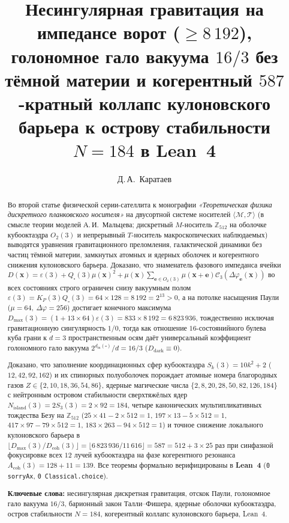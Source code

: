 \documentclass[11pt,a4paper]{article}
\title{\textbf{Несингулярная гравитация на импедансе ворот ($\ge 8\,192$), голономное гало вакуума $16/3$ без тёмной материи и когерентный $587$-кратный коллапс кулоновского барьера к острову стабильности $N = 184$ в Lean~4}}
\author{Д.\,А.~Каратаев}
\date{}
\theoremstyle{plain}
\theoremstyle{definition}
\begin{document}
\maketitle

\begin{abstract}
Во второй статье физической серии-сателлита к монографии \emph{«Теоретическая физика дискретного планковского носителя»} на двусортной системе носителей $\langle\mathcal{M},\mathcal{T}\rangle$ (в смысле теории моделей А.\,И.~Мальцева; дискретный $M$-носитель $\mathbb{Z}_{512}$ на оболочке кубооктаэдра $O_2(3)$ и непрерывный $T$-носитель макроскопических наблюдаемых) выводятся уравнения гравитационного преломления, галактической динамики без частиц тёмной материи, замкнутых атомных и ядерных оболочек и когерентного снижения кулоновского барьера. Доказано, что знаменатель фазового импеданса ячейки $D(\mathbf{x}) = \varepsilon(3) + Q_\square(3)\mu(\mathbf{x})^2 + \mu(\mathbf{x})\sum_{\mathbf{e}\in O_2(3)}\mu(\mathbf{x}+\mathbf{e})\mathcal{C}_3(\Delta\varphi_{\mathbf{e}}(\mathbf{x}))$ во всех состояниях строго ограничен снизу вакуумным полом $\varepsilon(3) = K_P(3)Q_\square(3) = 64\times 128 = 8\,192 = 2^{13} > 0$, а на потолке насыщения Паули ($\mu=64,\ \Delta\varphi=256$) достигает конечного максимума $D_{\max}(3) = (1 + 13\times 64)\varepsilon(3) = 833\times 8\,192 = 6\,823\,936$, тождественно исключая гравитационную сингулярность $1/0$, тогда как отношение $16$-состоянийного булева куба грани к $d=3$ пространственным осям даёт универсальный коэффициент голономного гало вакуума $2^{d_{\mathrm{in}}(\square)}/d = 16/3$ ($D_{\mathrm{dark}}\equiv 0$).

Доказано, что заполнение координационных сфер кубооктаэдра $S_k(3) = 10k^2 + 2$ ($12,42,92,162$) и их спинорных полуоболочек порождает атомные номера благородных газов $Z\in\{2,10,18,36,54,86\}$, ядерные магические числа $\{2,8,20,28,50,82,126,184\}$ с нейтронным островом стабильности сверхтяжёлых ядер $N_{\mathrm{island}}(3) = 2S_3(3) = 2\times 92 = 184$, четыре канонических мультипликативных тождества Безу на $\mathbb{Z}_{512}$ ($25\times 41 - 2\times 512 = 1$, $197\times 13 - 5\times 512 = 1$, $417\times 97 - 79\times 512 = 1$, $183\times 263 - 94\times 512 = 1$) и точное снижение локального кулоновского барьера в $\lfloor D_{\max}(3)/D_{\mathrm{coh}}(3)\rfloor = \lfloor 6\,823\,936/11\,616\rfloor = 587 = 512 + 3\times 25$ раз при синфазной фокусировке всех $12$ лучей кубооктаэдра на фазе когерентного резонанса $A_{\mathrm{coh}}(3) = 128 + 11 = 139$. Все теоремы формально верифицированы в \textbf{Lean~4} (\texttt{0 sorryAx}, \texttt{0 Classical.choice}).

\medskip\noindent
\textbf{Ключевые слова:} несингулярная дискретная гравитация, отскок Паули, голономное гало вакуума $16/3$, барионный закон Талли--Фишера, ядерные оболочки кубооктаэдра, остров стабильности $N=184$, когерентный коллапс кулоновского барьера, Lean~4.
\end{abstract}
\end{document}
